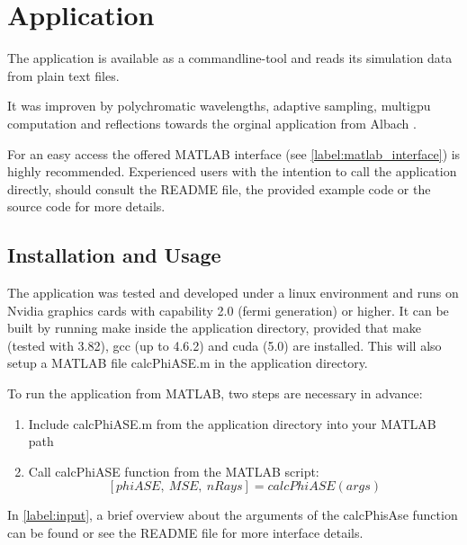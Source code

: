 \section{Application}

The application is available as a commandline-tool and reads
its simulation data from plain text files. 

It was improven by polychromatic wavelengths, adaptive sampling, multigpu computation and 
reflections towards the orginal application from Albach \cite{ASE2010}.

For an easy access the offered MATLAB interface (see \ref{label:matlab_interface}) 
is highly recommended. Experienced users with the intention to call the application
directly, should consult the README file, the provided 
example code or the source code for more details.

\subsection{Installation and Usage}
The application was tested and developed under a linux environment
and runs on Nvidia graphics cards with capability 2.0 (fermi generation) or higher.
It can be built by running make inside the application directory, provided
that make (tested with 3.82), gcc (up to 4.6.2) and cuda (5.0) are installed. 
This will also setup a MATLAB file calcPhiASE.m in the application
directory. 

To run the application from MATLAB, two steps are
necessary in advance:
\begin{enumerate}
  \label{label:matlab_interface}
  \item Include calcPhiASE.m from the application directory into your MATLAB path
  \item Call calcPhiASE function from the MATLAB script: \[[phiASE,~MSE,~nRays] = calcPhiASE(args)\]
\end{enumerate}
In \ref{label:input}, a brief overview about the
arguments of the calcPhisAse function can be found 
or see the README file for more interface details.






